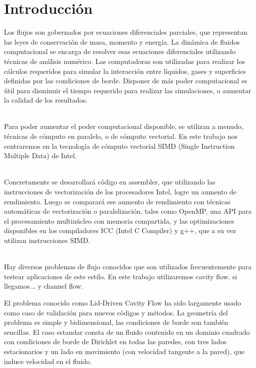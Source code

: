 \section{Introducción}%
Los flujos son gobernados por ecuaciones diferenciales parciales, que representan las leyes de conservación de masa, momento y energía. La dinámica de fluidos computacional se encarga de resolver esas ecuaciones diferenciales utilizando técnicas de análisis numérico. Las computadoras son utilizadas para realizar los cálculos requeridos para simular la interacción entre líquidos, gases y superficies definidas por las condiciones de borde. Disponer de más poder computacional es útil para disminuir el tiempo requerido para realizar las simulaciones, o aumentar la calidad de los resultados.

~\\
Para poder aumentar el poder computacional disponible, se utilizan a menudo, técnicas de cómputo en paralelo, o de cómputo vectorial. En este trabajo nos centraremos en la tecnología de cómputo vectorial SIMD (Single Instruction Multiple Data) de Intel.

~\\
Concretamente se desarrollará código en assembler, que utilizando las instrucciones de vectorización de los procesadores Intel, logre un aumento de rendimiento. Luego se comparará ese aumento de rendimiento con técnicas automáticas de vectorización o paralelización, tales como OpenMP, una API para el procesamiento multinúcleo con memoria compartida, y las optimizaciones disponibles en los compiladores ICC (Intel C Compiler) y g++, que a su vez utilizan instrucciones SIMD.

~\\
Hay diversos problemas de flujo conocidos que son utilizados frecuentemente para testear aplicaciones de este estilo. En este trabajo utilizaremos cavity flow.  \colorbox{BurntOrange}{si llegamos... y channel flow. }

El problema conocido como Lid-Driven Cavity Flow ha sido largamente usado como caso de validación para nuevos códigos y métodos. La geometría del problema es simple y bidimensional, las condiciones de borde son también sencillas. El caso estandar consta de un fluido contenido en un dominio cuadrado con condiciones de borde de Dirichlet en todas las paredes, con tres lados estacionarios y un lado en movimiento (con velocidad tangente a la pared), que induce velocidad en el fluido.
